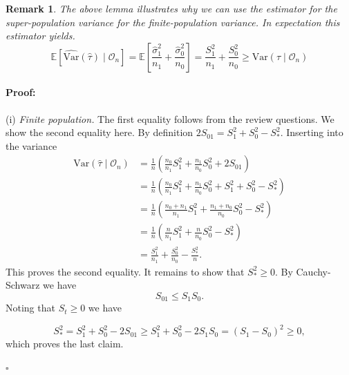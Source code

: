 \documentclass[11pt]{exam}
\theoremstyle{plain}
\newtheorem{remark}{Remark}
\newenvironment{proof}{\paragraph{Proof:}}{\hfill$\square$}
\newcommand{\Var}{\mathrm{Var}}
\begin{document}
\begin{remark}
    The above lemma illustrates why we can use the estimator for the super-population variance for the finite-population variance. In expectation this estimator yields.
    \[
    \mathbb{E}[\widehat{\Var}(\hat\tau) \mid \mathcal O_n] = \mathbb{E}\left[\frac{\hat\sigma_1^2}{n_1}+\frac{\hat\sigma_0^2}{n_0}\right] = \frac{S_1^2}{n_1}+\frac{S_0^2}{n_0} \geq \Var(\hat\tau \mid \mathcal O_n)
    \]
\end{remark}

\begin{proof}
(i) \emph{Finite population.} 
The first equality follows from the review questions. We show the second equality here. By definition $2S_{01} = S_1^2 + S_0^2 - S_\ast^2$. Inserting into the variance
\begin{align*}
     \Var(\hat\tau \mid \mathcal O_n)
    &= \frac{1}{n}\!\left(\frac{n_0}{n_1}S_1^2+\frac{n_1}{n_0}S_0^2+2S_{01}\right)
    \\
    &= \frac{1}{n}\!\left(\frac{n_0}{n_1}S_1^2+\frac{n_1}{n_0}S_0^2+S_1^2 + S_0^2 - S_\ast^2\right)
    \\
    &= \frac{1}{n}\!\left(\frac{n_0 + n_1}{n_1}S_1^2+\frac{n_1 + n_0}{n_0}S_0^2 - S_\ast^2\right)
    \\ 
    &= \frac{1}{n}\!\left(\frac{n}{n_1}S_1^2+\frac{n}{n_0}S_0^2 - S_\ast^2\right)
    \\
    &= \frac{S_1^2}{n_1}+\frac{S_0^2}{n_0}-\frac{S_\ast^2}{n}. 
\end{align*}
This proves the second equality. It remains to show that $S_\ast^2 \geq 0$. By Cauchy-Schwarz we have
\[
S_{01} \leq S_1 S_0.
\]
Noting that $S_t \geq 0$ we have 

\[S_\ast^2=S_1^2+S_0^2-2S_{01} \geq S_1^2+S_0^2 - 2S_1S_0 = (S_1 - S_0)^2 \geq 0,
\]
which proves the last claim.



\end{proof}
\end{document}
